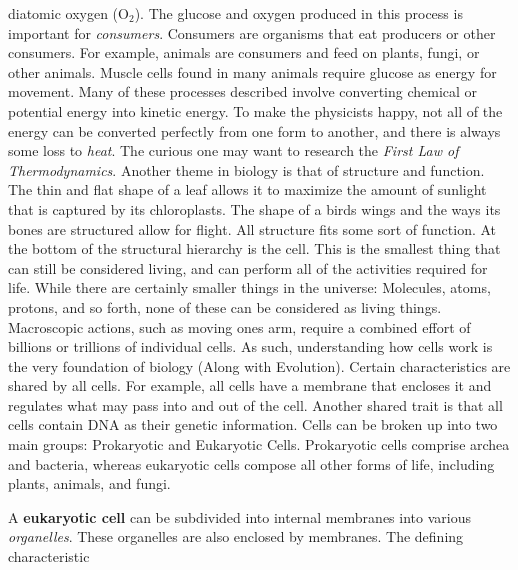 \documentclass[crop=false,class=book,oneside]{standalone}
\begin{document}
        diatomic oxygen ($\textrm{O}_{2}$). The glucose
        and oxygen produced in this process is important for
        \textit{consumers}. Consumers are organisms that
        eat producers or other consumers.
        For example, animals are consumers and feed on
        plants, fungi, or other animals. Muscle cells
        found in many animals require glucose as energy for
        movement. Many of these processes described involve
        converting chemical or potential energy into
        kinetic energy. To make the physicists happy,
        not all of the energy can be converted perfectly
        from one form to another, and there is always some
        loss to \textit{heat}. The curious one may want to
        research the \textit{First Law of Thermodynamics}.
        Another theme in biology is that of structure and
        function. The thin and flat shape of a leaf allows
        it to maximize the amount of sunlight that is
        captured by its chloroplasts. The shape of a birds
        wings and the ways its bones are structured allow
        for flight. All structure fits some sort of function.
        At the bottom of the structural hierarchy
        is the cell. This is the smallest thing that
        can still be considered living,
        and can perform all of the
        activities required for life. While there are
        certainly smaller things in the universe:
        Molecules, atoms, protons, and so forth, none of
        these can be considered as living things.
        Macroscopic actions, such as moving ones arm,
        require a combined effort of billions or trillions
        of individual cells. As such, understanding how
        cells work is the very foundation of biology
        (Along with Evolution). Certain characteristics
        are shared by all cells. For example, all cells have
        a membrane that encloses it and regulates what may
        pass into and out of the cell. Another shared trait
        is that all cells contain DNA as their genetic
        information. Cells can be broken up into two main
        groups: Prokaryotic and Eukaryotic Cells.
        Prokaryotic cells comprise archea and bacteria,
        whereas eukaryotic cells compose all other forms of
        life, including plants, animals, and fungi.
        \par\hfill\par
        A \textbf{eukaryotic cell} can be subdivided into
        internal membranes into various
        \textit{organelles}. These organelles are also
        enclosed by membranes. The defining characteristic
\end{document}
